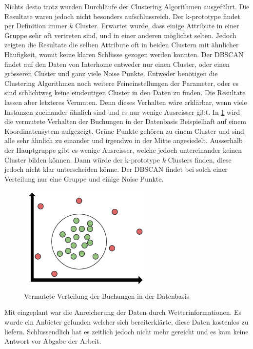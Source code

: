 Nichts desto trotz wurden Durchläufe der Clustering Algorithmen ausgeführt. Die Resultate waren jedoch nicht besonders aufschlussreich. Der k-prototype findet per Definition immer $k$ Cluster. Erwartet wurde, dass einige Attribute in einer Gruppe sehr oft vertreten sind, und in einer anderen möglichst selten. Jedoch zeigten die Resultate die selben Attribute oft in beiden Clustern mit ähnlicher Häufigkeit, womit keine klaren Schlüsse gezogen werden konnten. Der DBSCAN findet auf den Daten von Interhome entweder nur einen Cluster, oder einen grösseren Cluster und ganz viele Noise Punkte. Entweder benötigen die Clustering Algorithmen noch weitere Feineinstellungen der Parameter, oder es sind schlichtweg keine eindeutigen Cluster in den Daten zu finden. Die Resultate lassen aber letzteres Vermuten. Denn dieses Verhalten wäre erklärbar, wenn viele Instanzen zueinander ähnlich sind und es nur wenige Ausreisser gibt. In \cref{fig:proofofconcept:fazit:2} wird die vermutete Verhalten der Buchungen in der Datenbasis Beispielhaft auf einem Koordinatensytem aufgezeigt. Grüne Punkte gehören zu einem Cluster und sind alle sehr ähnlich zu einander und irgendwo in der Mitte angesiedelt. Ausserhalb der Hauptgruppe gibt es wenige Ausreisser, welche jedoch untereinander keinen Cluster bilden können. Dann würde der k-prototype $k$ Clusters finden, diese jedoch nicht klar unterscheiden könne. Der DBSCAN findet bei solch einer Verteilung nur eine Gruppe und einige Noise Punkte.

\begin{figure}[H]
	\RawFloats
	\centering
	\includegraphics[width=0.6\textwidth]{images/expected-data-distribution}
	\caption{Vermutete Verteilung der Buchungen in der Datenbasis}
	\label{fig:proofofconcept:fazit:2}
\end{figure}

Mit eingeplant war die Anreicherung der Daten durch Wetterinformationen. Es wurde ein Anbieter gefunden welcher sich bereiterklärte, diese Daten kostenlos zu liefern. Schlussendlich hat es zeitlich jedoch nicht mehr gereicht und es kam keine Antwort vor Abgabe der Arbeit.